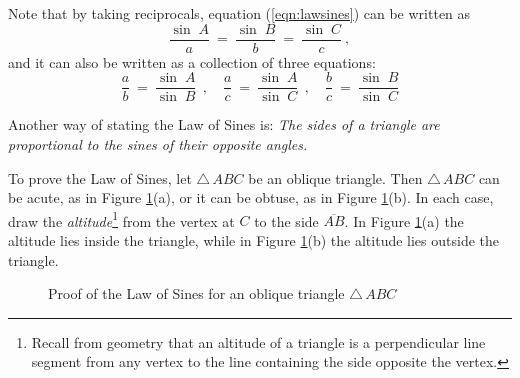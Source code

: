 \noindent Note that by taking reciprocals, equation (\ref{eqn:lawsines}) can be written as
\begin{equation}\label{eqn:lawsines2}
 \frac{\sin\;A}{a} ~=~ \frac{\sin\;B}{b} ~=~ \frac{\sin\;C}{c} ~,
\end{equation}
and it can also be written as a collection of three equations:
\begin{equation}\label{eqn:lawsines3}
 \frac{a}{b} ~=~ \frac{\sin\;A}{\sin\;B} ~~,\quad \frac{a}{c} ~=~ \frac{\sin\;A}{\sin\;C} ~~,\quad
 \frac{b}{c} ~=~ \frac{\sin\;B}{\sin\;C}
\end{equation}

Another way of stating the Law of Sines is: \emph{The sides of a triangle are proportional to the
sines of their opposite angles.}

To prove the Law of Sines, let $\triangle\,ABC$ be an oblique triangle. Then $\triangle\,ABC$ can be
acute, as in Figure \ref{fig:lawsines}(a), or it can be obtuse, as in Figure \ref{fig:lawsines}(b).
In each case, draw the \emph{altitude}\footnote{Recall from geometry that an altitude of a triangle
is a perpendicular line segment from any vertex to the line containing the side opposite the
vertex.} from the vertex at $C$ to the side $\overline{AB}$.
In Figure \ref{fig:lawsines}(a) the altitude lies inside the triangle,
while in Figure \ref{fig:lawsines}(b) the altitude lies outside the triangle.

\begin{figure}[h]
 \centering
 \qquad\qquad\qquad
 \caption[]{\quad Proof of the Law of Sines for an oblique triangle $\triangle\,ABC$}
 \label{fig:lawsines}
\end{figure}

